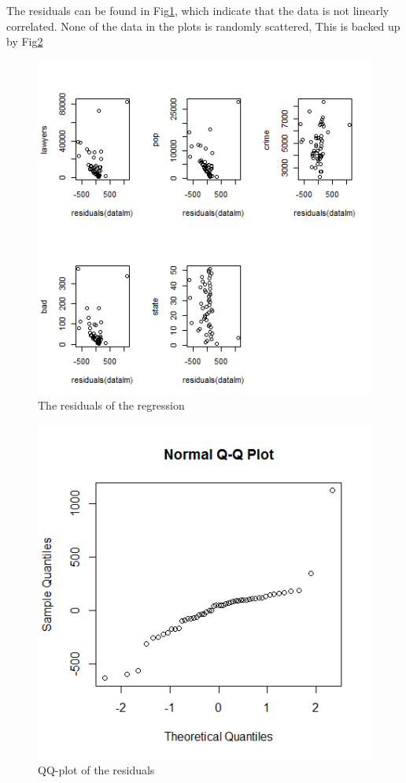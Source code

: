 \documentclass{article}
\begin{document}
    The residuals can be found in Fig\ref{fig:4res}, which indicate that the data is not linearly correlated. None of the data in the plots is randomly scattered, This is backed up by Fig\ref{fig:4qq}
    \begin{figure}[H]
        \centering
        \includegraphics[scale=0.6]{../results/4_res.png}
        \caption{The residuals of the regression}
        \label{fig:4res}
    \end{figure}
    
    \begin{figure}[H]
        \centering
        \includegraphics[scale=0.4]{../results/4_qq.png}
        \caption{QQ-plot of the residuals}
        \label{fig:4qq}
    \end{figure}
    
\end{document}
